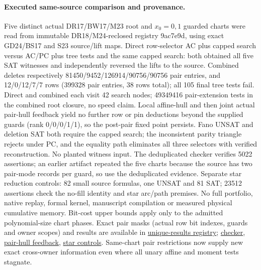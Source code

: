 \documentclass[11pt]{article}
\begin{document}
\paragraph{Executed same-source comparison and provenance.}
Five distinct actual DR17/BW17/M23 root and $x_0=0,1$ guarded charts were read from immutable DR18/M24-reclosed registry 9ac7e9d, using exact GD24/BS17 and S23 source/lift maps. Direct row-selector AC plus capped search versus AC/PC plus tree tests and the same capped search: both obtained all five SAT witnesses and independently reversed the lifts to the source. Combined deletes respectively 81450/9452/126914/90756/90756 pair entries, and 12/0/12/7/7 rows (399328 pair entries, 38 rows total); all 105 final tree tests fail. Direct and combined each visit 42 search nodes; 49349416 pair-extension tests in the combined root closure, no speed claim. Local affine-hull and then joint actual pair-hull feedback yield no further row or pin deductions beyond the supplied guards (rank 0/0/0/1/1), so the post-pair fixed point persists. Fano UNSAT and deletion SAT both require the capped search; the inconsistent parity triangle rejects under PC, and the equality path eliminates all three selectors with verified reconstruction. No planted witness input. The deduplicated checker verifies 5022 assertions; an earlier artifact repeated the five charts because the source has two pair-mode records per guard, so use the deduplicated evidence. Separate star reduction controls: 82 small source formulas, one UNSAT and 81 SAT; 23512 assertions check the no-fill identity and star arc/path premises. No full portfolio, native replay, formal kernel, manuscript compilation or measured physical cumulative memory. Bit-cost upper bounds apply only to the admitted polynomial-size chart phases. Exact pair masks (actual row bit indexes, guards and owner scopes) and results are available in \href{https://github.com/j15marti/pnp/commit/95b6fa097cebf52cdb045bc086ce9331eb74afc8}{unique-results registry}; \href{https://github.com/j15marti/pnp/commit/29780d088951357109724df77a8908813441e77b}{checker}, \href{https://github.com/j15marti/pnp/commit/84e7157801851cac0515af2870a88e2fd16eed6f}{pair-hull feedback}, \href{https://github.com/j15marti/pnp/commit/8b8b54e437498b30ab70e0dacefbf495ba470847}{star controls}. Same-chart pair restrictions now supply new exact cross-owner information even where all unary affine and moment tests stagnate.
\end{document}
